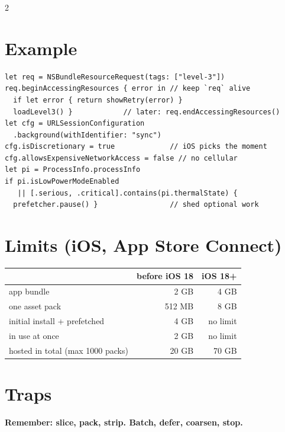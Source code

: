 \documentclass[8pt]{extarticle}
\begin{document}
\begin{multicols}{2}
\section{Example}
\begin{lstlisting}[language=SwiftSheet]
let req = NSBundleResourceRequest(tags: ["level-3"])
req.beginAccessingResources { error in // keep `req` alive
  if let error { return showRetry(error) }
  loadLevel3() }            // later: req.endAccessingResources()
let cfg = URLSessionConfiguration
  .background(withIdentifier: "sync")
cfg.isDiscretionary = true             // iOS picks the moment
cfg.allowsExpensiveNetworkAccess = false // no cellular
let pi = ProcessInfo.processInfo
if pi.isLowPowerModeEnabled
   || [.serious, .critical].contains(pi.thermalState) {
  prefetcher.pause() }                 // shed optional work
\end{lstlisting}

\section{Limits (iOS, App Store Connect)}
{\footnotesize
\begin{tabular}{@{}l r r@{}}
\toprule
 & before iOS 18 & iOS 18+ \\ \midrule
app bundle & 2 GB & 4 GB \\
one asset pack & 512 MB & 8 GB \\
initial install + prefetched & 4 GB & no limit \\
in use at once & 2 GB & no limit \\
hosted in total (max 1000 packs) & 20 GB & 70 GB \\
\bottomrule
\end{tabular}}

\section{Traps}
\begin{itemize}
\end{itemize}
\textbf{Remember: slice, pack, strip. Batch, defer, coarsen, stop.}

\end{multicols}

\end{document}

